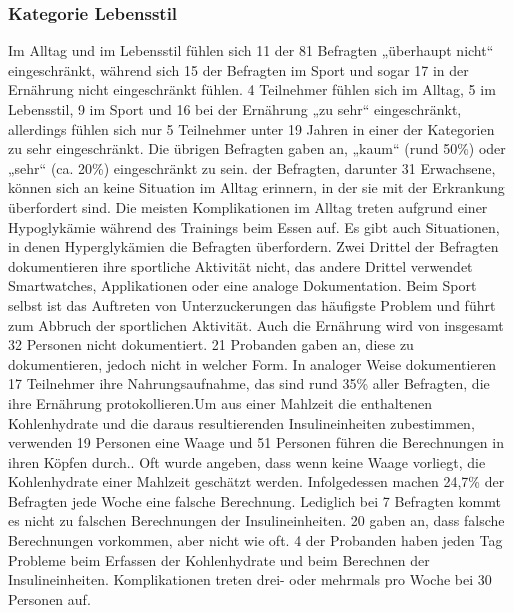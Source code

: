 \documentclass[a4paper,11pt]{article}%
\renewcommand{\\}{\vspace*{0.5\baselineskip} \newline}
\begin{document}
	\subsubsection{Kategorie \glqq Lebensstil\grqq{} }
	Im Alltag und im Lebensstil fühlen sich 11 der 81 Befragten „überhaupt nicht“ eingeschränkt, während sich 15 der Befragten im Sport und sogar 17 in der Ernährung nicht eingeschränkt fühlen. 4 Teilnehmer fühlen sich im Alltag, 5 im Lebensstil, 9 im Sport und 16 bei der Ernährung „zu sehr“ eingeschränkt, allerdings fühlen sich nur 5 Teilnehmer unter 19 Jahren in einer der Kategorien \glqq zu sehr\grqq{} eingeschränkt. Die übrigen Befragten gaben an, „kaum“ (rund 50\%) oder „sehr“ (ca. 20\%) eingeschränkt zu sein.\\
	39 der Befragten, darunter 31 Erwachsene, können sich an keine Situation im Alltag erinnern, in der sie mit der Erkrankung überfordert sind. Die meisten Komplikationen im Alltag treten aufgrund einer Hypoglykämie während des Trainings beim Essen auf. Es gibt auch Situationen, in denen Hyperglykämien die Befragten überfordern.\\
	Zwei Drittel der Befragten dokumentieren ihre sportliche Aktivität nicht, das andere Drittel verwendet Smartwatches, Applikationen oder eine analoge Dokumentation. Beim Sport selbst ist das Auftreten von Unterzuckerungen das häufigste Problem und führt zum Abbruch der sportlichen Aktivität.\newline
	Auch die Ernährung wird von insgesamt 32 Personen nicht dokumentiert. 21 Probanden gaben an, diese zu dokumentieren, jedoch nicht in welcher Form. In analoger Weise dokumentieren 17 Teilnehmer ihre Nahrungsaufnahme, das sind rund 35\% aller Befragten, die ihre Ernährung protokollieren.Um aus einer Mahlzeit die enthaltenen Kohlenhydrate und die daraus resultierenden Insulineinheiten zubestimmen, verwenden 19 Personen eine Waage und 51 Personen führen die Berechnungen in ihren Köpfen durch.. Oft wurde angeben, dass wenn keine Waage vorliegt, die Kohlenhydrate einer Mahlzeit geschätzt werden. Infolgedessen machen 24,7\% der Befragten jede Woche eine falsche Berechnung. Lediglich bei 7 Befragten kommt es nicht zu falschen Berechnungen der Insulineinheiten. 20 gaben an, dass falsche Berechnungen vorkommen, aber nicht wie oft. 4 der Probanden haben jeden Tag Probleme beim Erfassen der Kohlenhydrate und beim Berechnen der Insulineinheiten. Komplikationen treten drei- oder mehrmals pro Woche bei 30 Personen auf.
\end{document}
